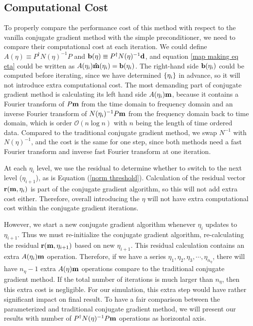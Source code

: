 \documentclass[twocolumn,linenumbers]{aastex631}
\newcommand{\vbd}{\vb{d}}
\newcommand{\vbm}{\vb{m}}
\newcommand{\vbb}{\vb{b}}
\newcommand{\inv}[1]{#1^{-1}}
\newcommand{\hatm}{\vb{\hat{m}}}
\newcommand{\Pdagger}{P^{\dagger}}
\begin{document}
\begin{CJK*}{UTF8}{gbsn}
\subsection{Computational Cost}
To properly compare the performance cost of this method with respect to {the} vanilla
conjugate gradient method with {the} simple preconditioner,
we need to compare their computational cost at each iteration.
{
We could define $A(\eta) \equiv \Pdagger \inv{N(\eta)} P$ and $\vbb(\eta) \equiv \Pdagger \inv{N(\eta)} \vbd$,
and equation \ref{map making eq eta} could be written as $A(\eta_i) \hatm(\eta_i) = \vbb(\eta_i)$.  The right-hand side
$\vbb(\eta_i)$ could be computed before iterating,
}
since we have determined $\qty{\eta_i}$ in advance,
so it will not introduce extra computational cost.
The most demanding part of conjugate gradient method is calculating
its left hand side $A(\eta_i) \vbm$, because it contains a Fourier transform of
$P\vbm$ from the time domain to frequency domain and an inverse Fourier transform
of $\inv{N(\eta_i)} P \vbm$ from the frequency domain back to time domain,
which is order $\mathcal{O}(n\log n)$ with $n$ being the length of time ordered
data.
Compared to the traditional conjugate gradient method,
we swap $\inv{N}$ with $\inv{N(\eta)}$, and the cost is the same for one step,
since both methods need a fast Fourier transform and inverse fast Fourier transform 
at one iteration.


At each $\eta_i$ level, we use the residual to determine whether to switch to the next level ($\eta_{i+1}$), as  is Equation (\ref{norm threshold}).
Calculation of the residual vector $\vb{r}(\vbm,\eta_i)$ is part of the conjugate gradient algorithm,
so this will not add extra cost either.
Therefore, overall introducing the $\eta$ will not have extra computational cost within the conjugate gradient iterations.

However, we start a new conjugate gradient algorithm whenever $\eta_i$ updates to $\eta_{i+1}$.
Thus we must re-initialize the conjugate gradient algorithm, re-calculating the residual $\vb{r}(\vbm, \eta_{i+1})$ based on new $\eta_{i+1}$.  
This residual calculation contains an extra $A(\eta_i) \vbm$ operation.
Therefore, if we have a series $\eta_1, \eta_2, \eta_3, \cdots, \eta_{n_{\eta}}$,
there will have $n_{\eta}-1$ extra $A(\eta) \vbm$ operations compare to {the} traditional conjugate gradient
method.
If the total number of iterations is much larger than $n_{\eta}$,
then this extra cost is negligible.
For our simulation, this extra step would have rather significant impact on final result.
To have a fair comparison between the parameterized and traditional conjugate gradient method,
we will present our results with number of $\Pdagger \inv{N(\eta)} P\vbm$ operations as horizontal axis.




\end{CJK*}
\end{document}
